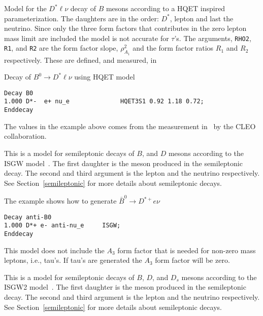 

\Expl
Model for the $D^{*}\ell\nu$ decay of
$B$ mesons according to a HQET inspired parameterization. 
The daughters are in the order: $D^*$,
lepton and last the neutrino. Since only the three
form factors that contributes in the zero lepton mass
limit are included the model is not accurate for $\tau$'s.
The arguments, {\tt RHO2}, {\tt R1}, and {\tt R2} are the 
form factor slope, $\rho^2_{A_1}$ and the form factor
ratios $R_1$ and $R_2$ respectively. These are defined,
and measured, in~\cite{Dubo96}

\Example
Decay of $B^0\rightarrow D^*\ell\nu$ using HQET model
\begin{verbatim}
Decay B0
1.000 D*-  e+ nu_e              HQET3S1 0.92 1.18 0.72;
Enddecay
\end{verbatim}

\Notes
The values in the example above comes from the measurement 
in~\cite{Dubo96} by the CLEO collaboration.




\label{isgw}



\Expl
This is a model for semileptonic decays of $B$, and $D$ mesons 
according to the ISGW model~\cite{Isgur89a}. The first daughter
is the meson produced in the semileptonic decay. The second and third
argument is the lepton and the neutrino respectively.
See Section~\ref{semileptonic} for more details about semileptonic
decays.

\Example
The example shows how to generate $\bar B^0\rightarrow D^{*+}e\nu$
\begin{verbatim}
Decay anti-B0
1.000 D*+ e- anti-nu_e     ISGW;
Enddecay
\end{verbatim}

\Notes
This model does not include the $A_3$ form factor that is 
needed for non-zero mass leptons, i.e., tau's. If tau's
are generated the $A_3$ form factor will be zero.





\label{isgw2}



\Expl
This is a model for semileptonic decays of $B$, $D$, and $D_s$ mesons 
according to the ISGW2 model~\cite{Scora95}. The first daughter
is the meson produced in the semileptonic decay. The second and third
argument is the lepton and the neutrino respectively.
See Section~\ref{semileptonic} for more details about semileptonic
decays.

